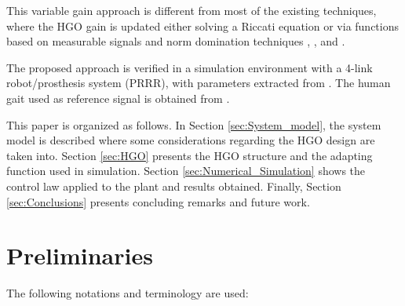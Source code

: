 \documentclass[letterpaper, 10 pt, journal, twocolumn]{IEEEtran}  %
\theoremstyle{plain}
\theoremstyle{definition}
\theoremstyle{remark}
\begin{document}
This variable gain approach is different from most of the existing techniques,
where the HGO gain is updated either solving a Riccati equation
\cite{P:01}\cite{P:07}\cite{GAL:06} or via 
functions based on measurable signals and norm
domination techniques \cite{LL:05}, \cite{P:07}, \cite{APA:09} and \cite{POH:2011}.

The proposed approach is verified in a simulation environment with a 4-link robot/prosthesis system (PRRR), with parameters extracted from \cite{Richter2015}. The human gait used as reference signal is obtained from \cite{Schwartz2008}.

This paper is organized as follows. In Section \ref{sec:System_model}, the system model is described where some considerations regarding the HGO design are taken into. Section \ref{sec:HGO} presents the HGO structure and the adapting function used in simulation. Section \ref{sec:Numerical_Simulation} shows the control law applied to the plant and results obtained. Finally, Section \ref{sec:Conclusions} presents concluding remarks and future work.

\section{Preliminaries}


The following notations and terminology are used:%



\end{document}

